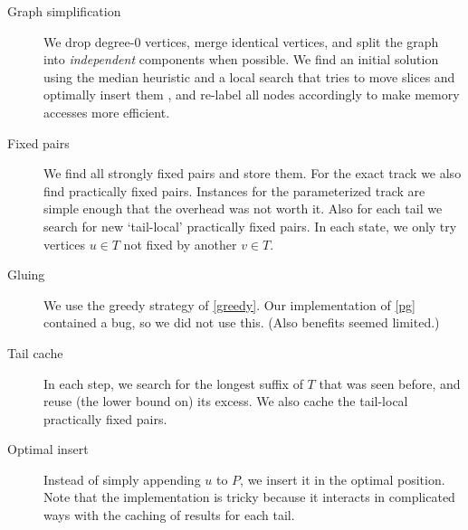 \documentclass[a4paper,UKenglish,cleveref, autoref, thm-restate]{lipics-v2021}
\begin{document}
\begin{description}
  \item[Graph simplification] We drop degree-$0$ vertices, merge identical
    vertices, and split the graph into \emph{independent} components
    \cite[Corollary 2]{dujmovic_2004} when
    possible. We find an initial solution using the median heuristic \cite{eades_median,eades_median_2} and a local search that tries to move
    slices and optimally insert them \cite{makinen_experiments,eades_heuristics}, and re-label all nodes accordingly to make
    memory accesses more efficient.
  \item[Fixed pairs] We find all strongly fixed pairs and store them. For the
    exact track we also find practically fixed pairs. Instances for the parameterized
    track are simple enough that the overhead was not worth it. Also for each
    tail we search for new `tail-local' practically fixed pairs. In each state, we only
    try vertices $u\in T$ not fixed by another $v\in T$.
  \item[Gluing] We use the greedy strategy of \cref{greedy}. Our implementation
    of \cref{pg} contained a bug, so we did not use this. (Also benefits
    seemed limited.)
  \item[Tail cache] In each step, we search for the longest suffix of $T$ that
    was seen before, and reuse (the lower bound on) its excess. We also
    cache the tail-local practically fixed pairs.
  \item[Optimal insert] Instead of simply appending $u$ to $P$, we
    insert it in the optimal position. Note that the
    implementation is tricky because it interacts in complicated ways with
    the caching of results for each tail.
\end{description}

\newpage


\end{document}
